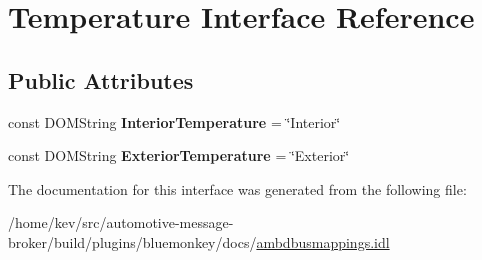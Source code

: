 \hypertarget{interfaceTemperature}{\section{Temperature Interface Reference}
\label{interfaceTemperature}
}
\subsection*{Public Attributes}
\begin{DoxyCompactItemize}
\item 
\hypertarget{interfaceTemperature_aa5249b5e464e788f5d4f1b2614c5be54}{const D\+O\+M\+String {\bfseries Interior\+Temperature} = \char`\"{}Interior\char`\"{}}\label{interfaceTemperature_aa5249b5e464e788f5d4f1b2614c5be54}

\item 
\hypertarget{interfaceTemperature_abdf63b22d961bf4ba275daf5da750c45}{const D\+O\+M\+String {\bfseries Exterior\+Temperature} = \char`\"{}Exterior\char`\"{}}\label{interfaceTemperature_abdf63b22d961bf4ba275daf5da750c45}

\end{DoxyCompactItemize}


The documentation for this interface was generated from the following file\+:\begin{DoxyCompactItemize}
\item 
/home/kev/src/automotive-\/message-\/broker/build/plugins/bluemonkey/docs/\hyperlink{ambdbusmappings_8idl}{ambdbusmappings.\+idl}\end{DoxyCompactItemize}
